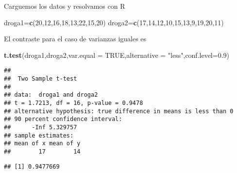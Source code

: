 \documentclass[
]{article}
\newenvironment{Shaded}{\begin{snugshade}}{\end{snugshade}}
\newcommand{\DataTypeTok}[1]{\textcolor[rgb]{0.13,0.29,0.53}{#1}}
\newcommand{\DecValTok}[1]{\textcolor[rgb]{0.00,0.00,0.81}{#1}}
\newcommand{\FloatTok}[1]{\textcolor[rgb]{0.00,0.00,0.81}{#1}}
\newcommand{\KeywordTok}[1]{\textcolor[rgb]{0.13,0.29,0.53}{\textbf{#1}}}
\newcommand{\NormalTok}[1]{#1}
\newcommand{\OperatorTok}[1]{\textcolor[rgb]{0.81,0.36,0.00}{\textbf{#1}}}
\newcommand{\OtherTok}[1]{\textcolor[rgb]{0.56,0.35,0.01}{#1}}
\newcommand{\StringTok}[1]{\textcolor[rgb]{0.31,0.60,0.02}{#1}}
\begin{document}
Carguemos los datos y resolvamos con R

\begin{Shaded}
\begin{Highlighting}[]
\NormalTok{droga1=}\KeywordTok{c}\NormalTok{(}\DecValTok{20}\NormalTok{,}\DecValTok{12}\NormalTok{,}\DecValTok{16}\NormalTok{,}\DecValTok{18}\NormalTok{,}\DecValTok{13}\NormalTok{,}\DecValTok{22}\NormalTok{,}\DecValTok{15}\NormalTok{,}\DecValTok{20}\NormalTok{)}
\NormalTok{droga2=}\KeywordTok{c}\NormalTok{(}\DecValTok{17}\NormalTok{,}\DecValTok{14}\NormalTok{,}\DecValTok{12}\NormalTok{,}\DecValTok{10}\NormalTok{,}\DecValTok{15}\NormalTok{,}\DecValTok{13}\NormalTok{,}\DecValTok{9}\NormalTok{,}\DecValTok{19}\NormalTok{,}\DecValTok{20}\NormalTok{,}\DecValTok{11}\NormalTok{)}
\end{Highlighting}
\end{Shaded}

El contraste para el caso de varianzas iguales es

\begin{Shaded}
\begin{Highlighting}[]
\KeywordTok{t.test}\NormalTok{(droga1,droga2,}\DataTypeTok{var.equal =} \OtherTok{TRUE}\NormalTok{,}\DataTypeTok{alternative =} \StringTok{"less"}\NormalTok{,}\DataTypeTok{conf.level=}\FloatTok{0.9}\NormalTok{)}
\end{Highlighting}
\end{Shaded}

\begin{verbatim}
## 
##  Two Sample t-test
## 
## data:  droga1 and droga2
## t = 1.7213, df = 16, p-value = 0.9478
## alternative hypothesis: true difference in means is less than 0
## 90 percent confidence interval:
##      -Inf 5.329757
## sample estimates:
## mean of x mean of y 
##        17        14
\end{verbatim}

\begin{Shaded}
\end{Shaded}

\begin{verbatim}
## [1] 0.9477669
\end{verbatim}
\end{document}
